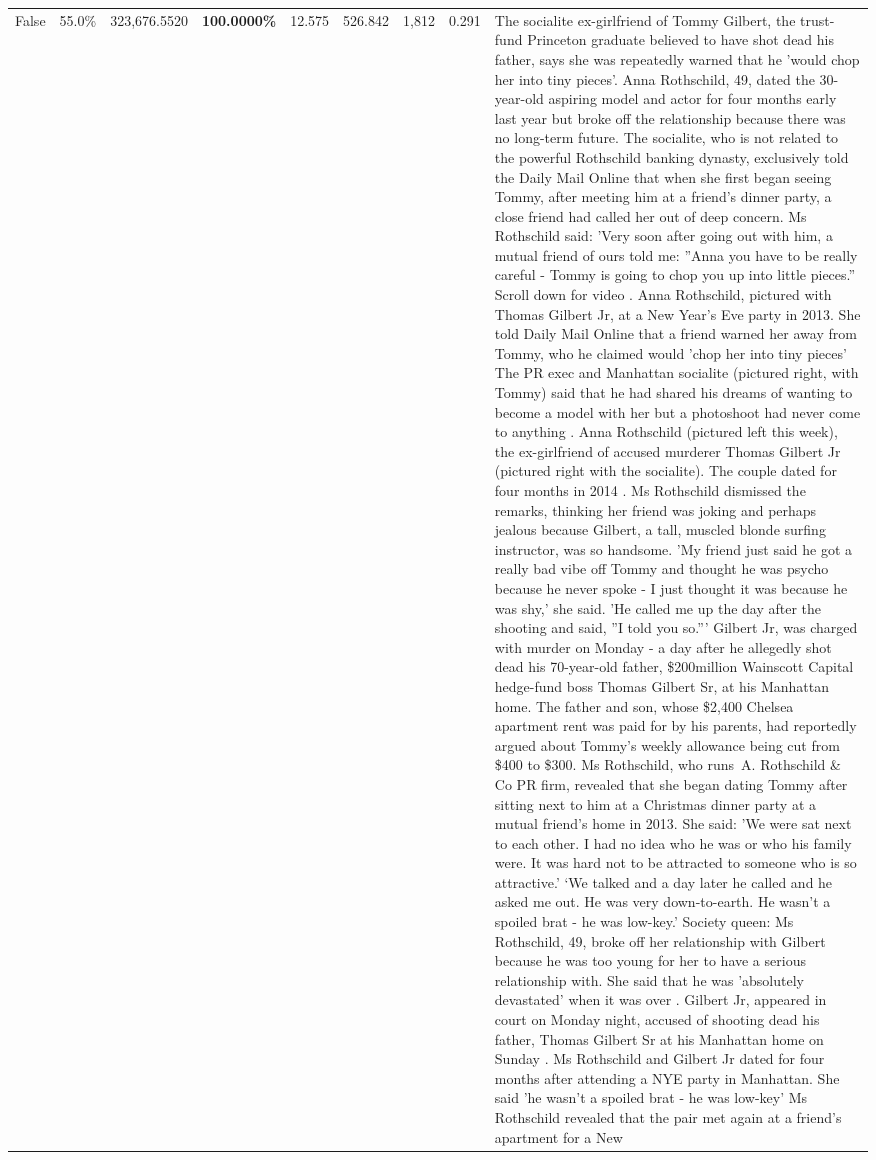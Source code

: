 \begin{table}[H]
\begin{tabular}{lllrlllll}
False & 55.0\% & 323,676.5520 & \bfseries \color{red} 100.0000\% & 12.575 & 526.842 & 1,812 & 0.291 & The socialite ex-girlfriend of Tommy Gilbert, the trust-fund Princeton graduate believed to have shot dead his father, says she was repeatedly warned that he 'would chop her into tiny pieces'. Anna Rothschild, 49, dated the 30-year-old aspiring model and actor for four months early last year but broke off the relationship because there was no long-term future. The socialite, who is not related to the powerful Rothschild banking dynasty, exclusively told the Daily Mail Online that when she first began seeing Tommy, after meeting him at a friend's dinner party, a close friend had called her out of deep concern. Ms Rothschild said: 'Very soon after going out with him, a mutual friend of ours told me: ''Anna you have to be really careful - Tommy is going to chop you up into little pieces.'' Scroll down for video . Anna Rothschild, pictured with Thomas Gilbert Jr, at a New Year's Eve party in 2013. She told Daily Mail Online that a friend warned her away from Tommy, who he claimed would 'chop her into tiny pieces' The PR exec and Manhattan socialite (pictured right, with Tommy) said that he had shared his dreams of wanting to become a model with her but a photoshoot had never come to anything . Anna Rothschild (pictured left this week), the ex-girlfriend of accused murderer Thomas Gilbert Jr (pictured right with the socialite). The couple dated for four months in 2014 . Ms Rothschild dismissed the remarks, thinking her friend was joking and perhaps jealous because Gilbert, a tall, muscled blonde surfing instructor, was so handsome. 'My friend just said he got a really bad vibe off Tommy and thought he was psycho because he never spoke - I just thought it was because he was shy,' she said. 'He called me up the day after the shooting and said, ''I told you so.''' Gilbert Jr, was charged with murder on Monday - a day after he allegedly shot dead his 70-year-old father, \$200million Wainscott Capital hedge-fund boss Thomas Gilbert Sr, at his Manhattan home. The father and son, whose \$2,400 Chelsea apartment rent was paid for by his parents, had reportedly argued about Tommy's weekly allowance being cut from \$400 to \$300. Ms Rothschild, who runs A. Rothschild \& Co PR firm, revealed that she began dating Tommy after sitting next to him at a Christmas dinner party at a mutual friend's home in 2013. She said: 'We were sat next to each other. I had no idea who he was or who his family were. It was hard not to be attracted to someone who is so attractive.' ‘We talked and a day later he called and he asked me out. He was very down-to-earth. He wasn’t a spoiled brat - he was low-key.’ Society queen: Ms Rothschild, 49, broke off her relationship with Gilbert because he was too young for her to have a serious relationship with. She said that he was 'absolutely devastated' when it was over . Gilbert Jr, appeared in court on Monday night, accused of shooting dead his father, Thomas Gilbert Sr at his Manhattan home on Sunday . Ms Rothschild and Gilbert Jr dated for four months after attending a NYE party in Manhattan. She said 'he wasn't a spoiled brat - he was low-key' Ms Rothschild revealed that the pair met again at a friend’s apartment for a New 
\end{tabular}
\end{table}
